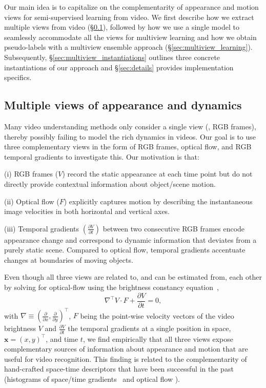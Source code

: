 \documentclass[10pt,twocolumn,letterpaper]{article}
\newcommand{\sref}[1]{\S\ref{#1}}
\begin{document}
Our main idea is to capitalize on the complementarity of appearance and motion views {for semi-supervised learning from video}. 
We first describe how we extract multiple views from video (\sref{sec:multiple views}), followed by how we use a single model to seamlessly accommodate all the views for multiview learning and how we obtain pseudo-labels with a multiview ensemble approach (\sref{sec:multiview_learning}). Subsequently, \sref{sec:multiview_instantiations} outlines three concrete instantiations of our approach and \sref{sec:details} provides implementation specifics. 


\subsection{Multiple views of appearance and dynamics}\label{sec:multiple views}
{Many} video understanding methods only consider a single view (\ie, RGB frames), thereby possibly {failing to model} the rich dynamics in videos. 
Our goal is to use three complementary  views in the form of RGB frames, optical flow, and RGB temporal gradients to investigate this. Our motivation is that:

(i) RGB frames ($V$) record the static appearance at each time point but do not directly 
provide contextual information about object/scene motion. 

(ii) Optical flow ($F$) explicitly captures motion by describing the instantaneous image velocities in both horizontal and vertical axes.


(iii) Temporal gradients $(\frac{\partial V}{\partial t})$  between two consecutive RGB frames encode appearance change and correspond to dynamic information that deviates from a purely static scene. 
{Compared to optical flow, temporal gradients accentuate changes at boundaries of moving objects.}

Even though all three views are related to, and can be estimated from, each other by solving for optical-flow using the brightness constancy equation~\cite{horn1981determining},
\begin{equation}
	\nabla^\top V \cdot F + \frac{\partial V}{\partial t} = 0,
	\label{eq:ofce}
\end{equation}
with $\nabla \equiv (\frac{\partial}{\partial x}, \frac{\partial}{\partial y})^\top$, $F$ being the point-wise velocity vectors of the video brightness $V$ and $\frac{\partial V}{\partial t}$ the temporal gradients at a single position in space, $\mathbf{x}=(x,y)^\top$, and time $t$, we find empirically that all three views {expose} complementary sources of information about appearance and motion that are useful for video recognition. This finding is related to the complementarity of hand-crafted space-time descriptors that have been successful in the past 
(\eg histograms of space/time gradients~\cite{dalal2005histograms,Klaeser2008,DollarPETS05} and optical flow \cite{dalal2006human,wang2013action}).
\end{document}
